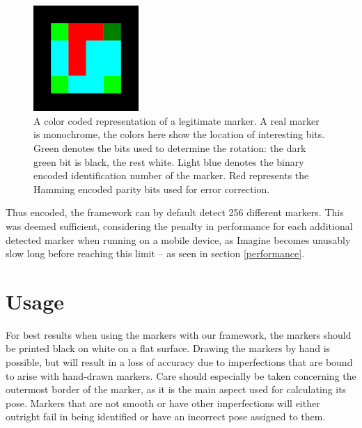 \begin{figure}
	\centering
	\includegraphics[width=4cm]{img/marker_template.png}
	\caption[Template Marker.]{A color coded representation of a legitimate marker. A real marker is monochrome, the colors here show the location of interesting bits. Green denotes the bits used to determine the rotation: the dark green bit is black, the rest white. Light blue denotes the binary encoded identification number of the marker. Red represents the Hamming encoded parity bits used for error correction.}
	\label{fig:marker_template}
\end{figure}

Thus encoded, the framework can by default detect 256 different markers.
This was deemed sufficient, considering the penalty in performance for each additional detected marker when running on a mobile device, as Imagine becomes unusably slow long before reaching this limit – as seen in section \ref{performance}.

\section{Usage}

For best results when using the markers with our framework, the markers should be printed black on white on a flat surface.
Drawing the markers by hand is possible, but will result in a loss of accuracy due to imperfections that are bound to arise with hand-drawn markers.
Care should especially be taken concerning the outermost border of the marker, as it is the main aspect used for calculating its pose.
Markers that are not smooth or have other imperfections will either outright fail in being identified or have an incorrect pose assigned to them.
